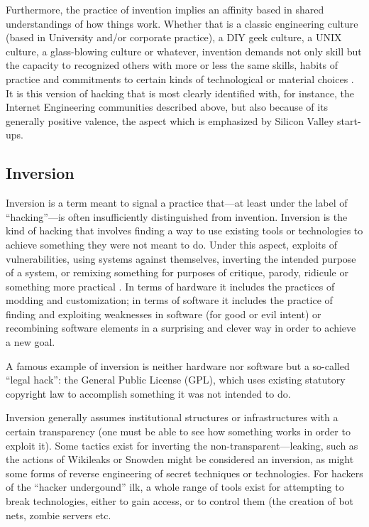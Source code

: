 \documentclass[10pt,letter,oneside]{scrartcl}
\begin{document}
Furthermore, the practice of invention implies an affinity based in shared
understandings of how things work.  Whether that is a classic engineering
culture (based in University and/or corporate practice), a DIY geek culture, a
UNIX culture, a glass-blowing culture \parencite{o2005embodied} or whatever,
invention demands not only skill but the capacity to recognized others with more
or less the same skills, habits of practice and commitments to certain kinds of
technological or material choices \parencite{Sennett2008}.  It is this version of hacking
that is most clearly identified with, for instance, the Internet Engineering
communities described above, but also because of its generally positive valence,
the aspect which is emphasized by Silicon Valley start-ups.

\subsection{Inversion}

Inversion is a term meant to signal a practice that---at least under the label
of ``hacking''---is often insufficiently distinguished from invention.
Inversion is the kind of hacking that involves finding a way to use existing
tools or technologies to achieve something they were not meant to do.  Under
this aspect, exploits of vulnerabilities, using systems against themselves,
inverting the intended purpose of a system, or remixing something for purposes
of critique, parody, ridicule or something more practical
\cite{galloway2007exploit}.  In terms of hardware it includes the practices of
modding and customization; in terms of software it includes the practice of
finding and exploiting weaknesses in software (for good or evil intent) or
recombining software elements in a surprising and clever way in order to achieve
a new goal.

A famous example of inversion is neither hardware nor software but a so-called
``legal hack'': the General Public License (GPL), which uses existing statutory
copyright law to accomplish something it was not intended to do.

Inversion generally assumes institutional structures or infrastructures with a
certain transparency (one must be able to see how something works in order to
exploit it).  Some tactics exist for inverting the non-transparent---leaking,
such as the actions of Wikileaks or Snowden might be considered an inversion, as
might some forms of reverse engineering of secret techniques or technologies.
For hackers of the ``hacker undergound'' ilk, a whole range of tools exist for
attempting to break technologies, either to gain access, or to control them (the
creation of bot nets, zombie servers etc. 
\end{document}
